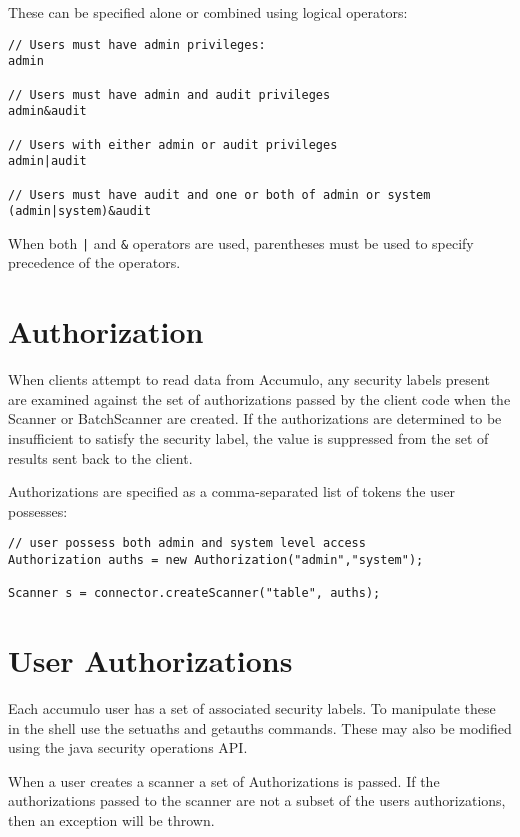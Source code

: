 These can be specified alone or combined using logical operators:

\small
\begin{verbatim}
// Users must have admin privileges:
admin

// Users must have admin and audit privileges
admin&audit

// Users with either admin or audit privileges
admin|audit

// Users must have audit and one or both of admin or system
(admin|system)&audit
\end{verbatim}
\normalsize

When both \verb^|^ and \verb^&^ operators are used, parentheses must be used to specify
precedence of the operators.

\section{Authorization}

When clients attempt to read data from Accumulo, any security labels present are
examined against the set of authorizations passed by the client code when the
Scanner or BatchScanner are created. If the authorizations are determined to be
insufficient to satisfy the security label, the value is suppressed from the set of
results sent back to the client.

Authorizations are specified as a comma-separated list of tokens the user possesses:

\small
\begin{verbatim}
// user possess both admin and system level access
Authorization auths = new Authorization("admin","system");

Scanner s = connector.createScanner("table", auths);
\end{verbatim}
\normalsize

\section{User Authorizations}

Each accumulo user has a set of associated security labels.  To manipulate
these in the shell use the setuaths and getauths commands.  These may also be
modified using the java security operations API.   

When a user creates a scanner a set of Authorizations is passed.  If the
authorizations passed to the scanner are not a subset of the users
authorizations, then an exception will be thrown.

